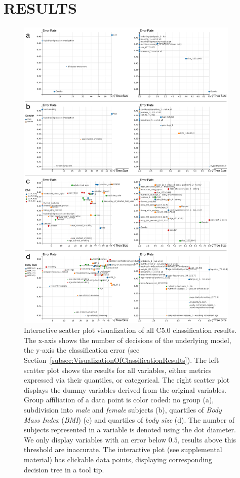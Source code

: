 \documentclass[a4paper,twoside]{style/article}
\begin{document}
\section{\uppercase{Results}}
\begin{figure}[p!]
  \centering
  \includegraphics[width=0.95\textwidth]{figures/results}
  \caption{
Interactive scatter plot visualization of all C5.0 classification results.
The x-axis shows the number of decisions of the underlying model, the y-axis the classification error (see Section~\ref{subsec:VisualizationOfClassificationResults}).
The left scatter plot shows the results for all variables, either metrics expressed via their quantiles, or categorical.
The right scatter plot displays the dummy variables derived from the original variables.
Group affiliation of a data point is color coded:
no group (a), subdivision into \emph{male} and \emph{female} subjects (b), quartiles of \emph{Body Mass Index} (\emph{BMI}) (c) and quartiles of \emph{body size} (d).
The number of subjects represented in a variable is denoted using the dot diameter.
We only display variables with an error below $0.5$, results above this threshold are inaccurate.
The interactive plot (see supplemental material) has clickable data points, displaying corresponding decision tree in a tool tip.
}
  \label{fig:results}
\end{figure}
\end{document}
